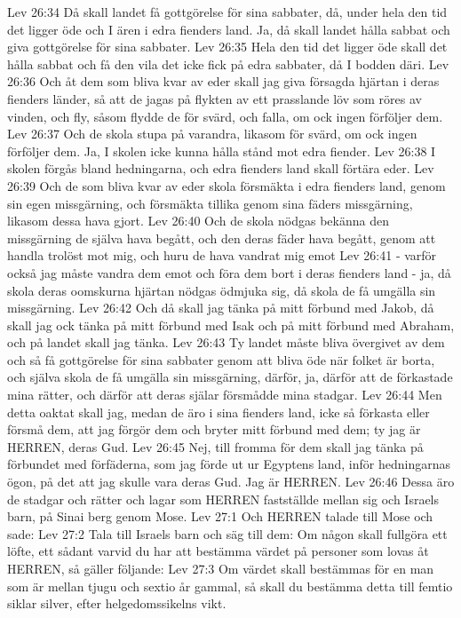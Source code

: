 Lev 26:34  Då skall landet få gottgörelse för sina sabbater, då, under hela den tid det ligger öde och I ären i edra fienders land. Ja, då skall landet hålla sabbat och giva gottgörelse för sina sabbater.
Lev 26:35  Hela den tid det ligger öde skall det hålla sabbat och få den vila det icke fick på edra sabbater, då I bodden däri.
Lev 26:36  Och åt dem som bliva kvar av eder skall jag giva försagda hjärtan i deras fienders länder, så att de jagas på flykten av ett prasslande löv som röres av vinden, och fly, såsom flydde de för svärd, och falla, om ock ingen förföljer dem.
Lev 26:37  Och de skola stupa på varandra, likasom för svärd, om ock ingen förföljer dem. Ja, I skolen icke kunna hålla stånd mot edra fiender.
Lev 26:38  I skolen förgås bland hedningarna, och edra fienders land skall förtära eder.
Lev 26:39  Och de som bliva kvar av eder skola försmäkta i edra fienders land, genom sin egen missgärning, och försmäkta tillika genom sina fäders missgärning, likasom dessa hava gjort.
Lev 26:40  Och de skola nödgas bekänna den missgärning de själva hava begått, och den deras fäder hava begått, genom att handla trolöst mot mig, och huru de hava vandrat mig emot
Lev 26:41  - varför också jag måste vandra dem emot och föra dem bort i deras fienders land - ja, då skola deras oomskurna hjärtan nödgas ödmjuka sig, då skola de få umgälla sin missgärning.
Lev 26:42  Och då skall jag tänka på mitt förbund med Jakob, då skall jag ock tänka på mitt förbund med Isak och på mitt förbund med Abraham, och på landet skall jag tänka.
Lev 26:43  Ty landet måste bliva övergivet av dem och så få gottgörelse för sina sabbater genom att bliva öde när folket är borta, och själva skola de få umgälla sin missgärning, därför, ja, därför att de förkastade mina rätter, och därför att deras själar försmådde mina stadgar.
Lev 26:44  Men detta oaktat skall jag, medan de äro i sina fienders land, icke så förkasta eller försmå dem, att jag förgör dem och bryter mitt förbund med dem; ty jag är HERREN, deras Gud.
Lev 26:45  Nej, till fromma för dem skall jag tänka på förbundet med förfäderna, som jag förde ut ur Egyptens land, inför hedningarnas ögon, på det att jag skulle vara deras Gud. Jag är HERREN.
Lev 26:46  Dessa äro de stadgar och rätter och lagar som HERREN fastställde mellan sig och Israels barn, på Sinai berg genom Mose.
Lev 27:1  Och HERREN talade till Mose och sade:
Lev 27:2  Tala till Israels barn och säg till dem: Om någon skall fullgöra ett löfte, ett sådant varvid du har att bestämma värdet på personer som lovas åt HERREN, så gäller följande:
Lev 27:3  Om värdet skall bestämmas för en man som är mellan tjugu och sextio år gammal, så skall du bestämma detta till femtio siklar silver, efter helgedomssikelns vikt.
